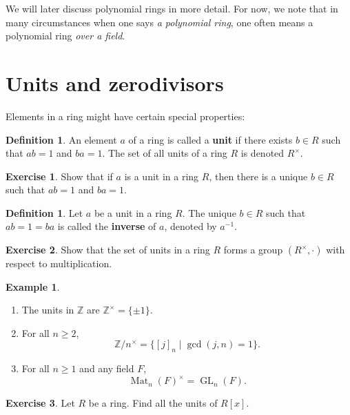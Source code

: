 \documentclass[12pt]{report}
\numberwithin{equation}{section}
\numberwithin{theorem}{chapter}
\theoremstyle{definition}
\newtheorem{definition}[theorem]{Definition}
\newtheorem{example}[theorem]{Example}
\newtheorem{exercise}{Exercise}
\newtheorem*{basic properties}{Basic Properties}
\newtheorem*{Important Remark}{Important Remark}
\newcommand{\df}[1]{{\bf #1}\index{#1}}
\DeclareMathOperator{\GL}{GL}
\newcommand{\Z}{\mathbb{Z}}
\DeclareMathOperator{\Mat}{Mat}
\begin{document}
We will later discuss polynomial rings in more detail. For now, we note that in many circumstances when one says \emph{a polynomial ring}, one often means a polynomial ring \emph{over a field}.




\section{Units and zerodivisors}


Elements in a ring might have certain special properties:



\begin{definition}
An element $a$ of a ring is called a \df{unit} if there exists $b\in R$ such that $ab=1$ and $ba=1$. 
The set of all units of a ring $R$ is denoted $R^\times$. 
\end{definition}


\begin{exercise}
	Show that if $a$ is a unit in a ring $R$, then there is a unique $b \in R$ such that $ab=1$ and $ba=1$. 
\end{exercise}


\begin{definition}
	Let $a$ be a unit in a ring $R$. The unique $b \in R$ such that $ab=1=ba$ is called the \df{inverse} of $a$, denoted by $a^{-1}$. 
\end{definition}

\begin{exercise}
	Show that the set of units in a ring $R$ forms a group $(R^\times,\cdot)$ with respect to multiplication.
\end{exercise}


\begin{example}$\,$
\vspace{-0.5em}
\begin{enumerate}[itemsep=-0.1em]
	\item The units in $\Z$ are $\Z^\times = \{\pm 1\}$.
	\item For all $n \geqslant 2$, 
	$$\Z/n^\times = \{[j]_n \mid \gcd(j,n) = 1 \}.$$
	\item For all $n \geqslant 1$ and any field $F$,
$$\Mat_{n}(F)^\times = \GL_n(F).$$
\end{enumerate}
\end{example}


\begin{exercise}
	Let $R$ be a ring. Find all the units of $R[x]$.
\end{exercise}
\end{document}
